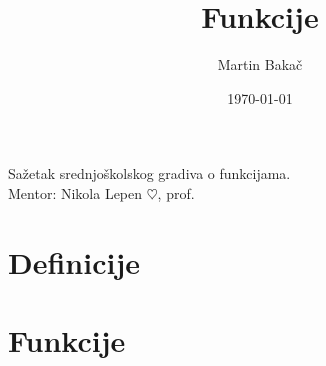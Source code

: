 \documentclass[11pt, notitlepage, a4paper]{article}
\title{Funkcije}
\author{Martin Bakač}
\date{\today}
\begin{document}
    \maketitle
    \begin{center}
        Sažetak srednjoškolskog gradiva o funkcijama.
        \\
        Mentor: Nikola Lepen $\heartsuit$, prof.
    \end{center}
    \tableofcontents
    \newpage
    \section{Definicije}
        
    \newpage
    \section{Funkcije}
        
\end{document}
